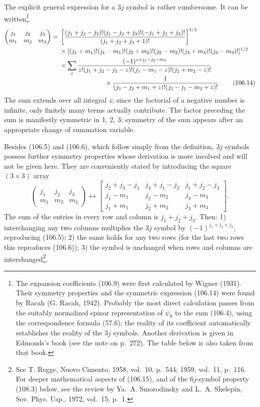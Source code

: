 The explicit general expression for a $3j$ symbol is rather cumbersome. It can be written\footnote{The expansion coefficients (106.9) were first calculated by Wigner (1931). Their symmetry properties and the symmetric expression (106.14) were found by Racah (G. Racah, 1942). Probably the most direct calculation passes from the suitably normalized spinor representation of $\psi_0$ to the sum (106.4), using the correspondence formula (57.6); the reality of its coefficient automatically establishes the reality of the $3j$ symbols. Another derivation is given in Edmonds's book (see the note on p.~272). The table below is also taken from that book.}
\begingroup\small
\begin{align}
\begin{pmatrix}j_1&j_2&j_3\\m_1&m_2&m_3\end{pmatrix}
={}&\left[\frac{(j_1+j_2-j_3)!(j_1-j_2+j_3)!(-j_1+j_2+j_3)!}{(j_1+j_2+j_3+1)!}\right]^{1/2}\notag\\
&\times[(j_1+m_1)!(j_1-m_1)!(j_2+m_2)!(j_2-m_2)!(j_3+m_3)!(j_3-m_3)!]^{1/2}\notag\\
&\times\sum_z\frac{(-1)^{z+j_1-j_2-m_3}}{z!(j_1+j_2-j_3-z)!(j_1-m_1-z)!(j_2+m_2-z)!}\notag\\[-2pt]
&\hspace{25mm}\times\frac1{(j_3-j_2+m_1+z)!(j_3-j_1-m_2+z)!}.
\tag{106.14}
\end{align}
\endgroup
The sum extends over all integral $z$; since the factorial of a negative number is infinite, only finitely many terms actually contribute. The factor preceding the sum is manifestly symmetric in 1, 2, 3; symmetry of the sum appears after an appropriate change of summation variable.

Besides (106.5) and (106.6), which follow simply from the definition, $3j$ symbols possess further symmetry properties whose derivation is more involved and will not be given here. They are conveniently stated by introducing the square $(3\times3)$ array
\begin{equation}
\begin{pmatrix}j_1&j_2&j_3\\m_1&m_2&m_3\end{pmatrix}
\longleftrightarrow
\begin{bmatrix}
j_2+j_3-j_1&j_3+j_1-j_2&j_1+j_2-j_3\\
j_1-m_1&j_2-m_2&j_3-m_3\\
j_1+m_1&j_2+m_2&j_3+m_3
\end{bmatrix}.
\tag{106.15}
\end{equation}
The sum of the entries in every row and column is $j_1+j_2+j_3$. Then: 1) interchanging any two columns multiplies the $3j$ symbol by $(-1)^{j_1+j_2+j_3}$, reproducing (106.5); 2) the same holds for any two rows (for the last two rows this reproduces (106.6)); 3) the symbol is unchanged when rows and columns are interchanged\footnote{See T. Regge, Nuovo Cimento, 1958, vol.~10, p.~544; 1959, vol.~11, p.~116. For deeper mathematical aspects of (106.15), and of the $6j$-symbol property (108.3) below, see the review by Ya.~A. Smorodinsky and L.~A. Shelepin, Sov. Phys. Usp., 1972, vol.~15, p.~1.}.

